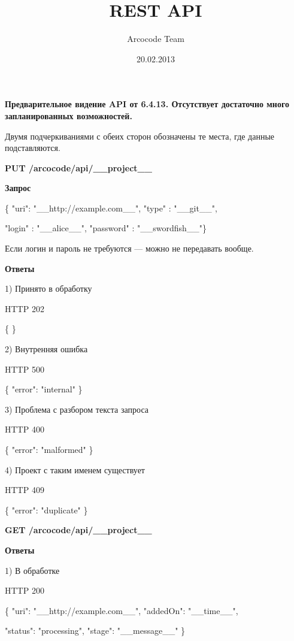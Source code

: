 \documentclass[a4paper,12pt]{article}
\title{REST API}
\date{20.02.2013}
\author{Arcocode Team}
\begin{document}
\maketitle
\newpage
\textbf{Предварительное видение API от 6.4.13. Отсутствует достаточно много запланированных возможностей.}
\newline

Двумя подчеркиваниями с обеих сторон обозначены те места, где данные подставляются.
\newline

\textbf{PUT /arcocode/api/\_\_project\_\_}

\textbf{Запрос}
\newline

\{ "uri": "\_\_http://example.com\_\_", "type" : "\_\_git\_\_", 

"login" : "\_\_alice\_\_", "password" : "\_\_swordfish\_\_"\}

Если логин и пароль не требуются — можно не передавать вообще.
\newline

\textbf{Ответы}
\newline

1) Принято в обработку

HTTP 202

\{  \}
\newline

2) Внутренняя ошибка

HTTP 500

\{ "error": "internal" \}
\newline

3) Проблема с разбором текста запроса

HTTP 400

\{ "error": "malformed" \}
\newline

4) Проект с таким именем существует

HTTP 409

\{ "error": "duplicate" \}

\newpage
\textbf{GET /arcocode/api/\_\_project\_\_}

\textbf{Ответы}
\newline

1) В обработке

HTTP 200

\{ "uri": "\_\_http://example.com\_\_", "addedOn": "\_\_time\_\_", 

"status": "processing", "stage": "\_\_message\_\_" \}
\newline
\end{document}
